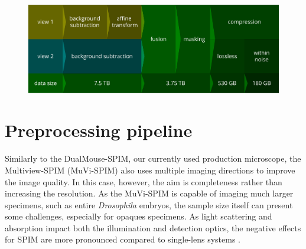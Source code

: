   \begin{figure}
    \centering
    \includegraphics[width=\textwidth]{pipeline}
    \label{fig:pipeline}
  \end{figure}








\section{Preprocessing pipeline}

Similarly to the DualMouse-SPIM, our currently used production microscope, the Multiview-SPIM (MuVi-SPIM) \cite{krzic_multiview_2012} also uses multiple imaging directions to improve the image quality. In this case, however, the aim is completeness rather than increasing the resolution. As the MuVi-SPIM is capable of imaging much larger specimens, such as entire \textit{Drosophila} embryos, the sample size itself can present some challenges, especially for opaques specimens. As light scattering and absorption impact both the illumination and detection optics, the negative effects for SPIM are more pronounced compared to single-lens systems \cite{de_medeiros_deep_2016}.




